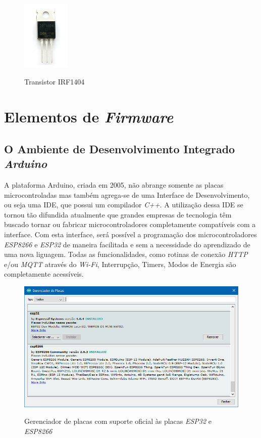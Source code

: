 \begin{figure}[H]
	\centering
	\caption{Transistor IRF1404}
	\includegraphics[width=0.2\textwidth]{figuras/IRF1404.png}
	\label{fig:IRF1404}
\end{figure} 



\section{Elementos de \textit{Firmware}}
\subsection{O Ambiente de Desenvolvimento Integrado \textit{Arduino}}

A plataforma Arduino, criada em 2005, não abrange somente as placas microcontroladas mas também agrega-se de uma Interface de Desenvolvimento, ou seja uma IDE, que possui um compilador \textit{C++}. A utilização dessa IDE se tornou tão difundida atualmente que grandes empresas de tecnologia têm buscado tornar ou fabricar microcontroladores completamente compatíveis com a interface.  
Com esta interface, será possível a programação dos microcontroladores \textit{ESP8266} e \textit{ESP32} de maneira facilitada e sem a necessidade do aprendizado de uma nova liguagem. Todas as funcionalidades, como rotinas de conexão \textit{HTTP} e/ou \textit{MQTT} através do \textit{Wi-Fi}, Interrupção, Timers, Modos de Energia são completamente acessíveis. 

\begin{figure}[H]
	\centering
	\caption{Gerenciador de placas com suporte oficial às placas \textit{ESP32} e \textit{ESP8266}}
	\includegraphics[width=1.0\textwidth]{figuras/gerenciador_placas_arduino.png}
	\label{fig:youcto-fluxo}
\end{figure} 

